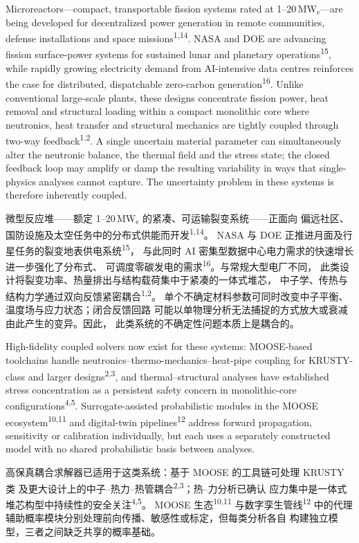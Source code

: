 \documentclass[11pt,a4paper]{article}
\begin{document}
Microreactors---compact, transportable fission systems rated at
1--20\,MW$_\mathrm{e}$---are being developed for decentralized power
generation in remote communities, defense installations and space
missions\textsuperscript{1,14}. NASA and DOE are advancing fission
surface-power systems for sustained lunar and planetary
operations\textsuperscript{15}, while rapidly growing electricity demand
from AI-intensive data centres reinforces the case for distributed,
dispatchable zero-carbon generation\textsuperscript{16}. Unlike
conventional large-scale plants, these designs concentrate fission power,
heat removal and structural loading within a compact monolithic core
where neutronics, heat transfer and structural mechanics are tightly
coupled through two-way feedback\textsuperscript{1,2}. A single
uncertain material parameter can simultaneously alter the neutronic
balance, the thermal field and the stress state; the closed feedback
loop may amplify or damp the resulting variability in ways that
single-physics analyses cannot capture. The uncertainty problem in these
systems is therefore inherently coupled.

微型反应堆——额定 1--20\,MW$_\mathrm{e}$ 的紧凑、可运输裂变系统——正面向
偏远社区、国防设施及太空任务中的分布式供能而开发\textsuperscript{1,14}。
NASA 与 DOE 正推进月面及行星任务的裂变地表供电系统\textsuperscript{15}，
与此同时 AI 密集型数据中心电力需求的快速增长进一步强化了分布式、
可调度零碳发电的需求\textsuperscript{16}。与常规大型电厂不同，
此类设计将裂变功率、热量排出与结构载荷集中于紧凑的一体式堆芯，
中子学、传热与结构力学通过双向反馈紧密耦合\textsuperscript{1,2}。
单个不确定材料参数可同时改变中子平衡、温度场与应力状态；闭合反馈回路
可能以单物理分析无法捕捉的方式放大或衰减由此产生的变异。因此，
此类系统的不确定性问题本质上是耦合的。

High-fidelity coupled solvers now exist for these systems: MOOSE-based
toolchains handle neutronics--thermo-mechanics--heat-pipe coupling for
KRUSTY-class and larger designs\textsuperscript{2,3}, and
thermal--structural analyses have established stress concentration as a
persistent safety concern in monolithic-core
configurations\textsuperscript{4,5}. Surrogate-assisted probabilistic
modules in the MOOSE ecosystem\textsuperscript{10,11} and digital-twin
pipelines\textsuperscript{12} address forward propagation, sensitivity or
calibration individually, but each uses a separately constructed model
with no shared probabilistic basis between analyses.

高保真耦合求解器已适用于这类系统：基于 MOOSE 的工具链可处理 KRUSTY 类
及更大设计上的中子--热力--热管耦合\textsuperscript{2,3}；热--力分析已确认
应力集中是一体式堆芯构型中持续性的安全关注\textsuperscript{4,5}。
MOOSE 生态\textsuperscript{10,11} 与数字孪生管线\textsuperscript{12}
中的代理辅助概率模块分别处理前向传播、敏感性或标定，但每类分析各自
构建独立模型，三者之间缺乏共享的概率基础。
\end{document}
